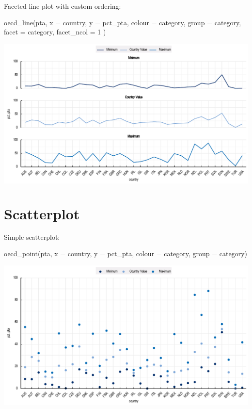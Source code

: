 \documentclass[
  11pt,
  oneside]{report}
\newenvironment{Shaded}{\begin{snugshade}}{\end{snugshade}}
\newcommand{\AttributeTok}[1]{\textcolor[rgb]{0.77,0.63,0.00}{#1}}
\newcommand{\DecValTok}[1]{\textcolor[rgb]{0.00,0.00,0.81}{#1}}
\newcommand{\FunctionTok}[1]{\textcolor[rgb]{0.00,0.00,0.00}{#1}}
\newcommand{\NormalTok}[1]{#1}
\begin{document}
Faceted line plot with custom ordering:

\begin{Shaded}
\begin{Highlighting}[]
\FunctionTok{oecd\_line}\NormalTok{(pta,}
  \AttributeTok{x =}\NormalTok{ country, }\AttributeTok{y =}\NormalTok{ pct\_pta, }\AttributeTok{colour =}\NormalTok{ category, }\AttributeTok{group =}\NormalTok{ category,}
  \AttributeTok{facet =}\NormalTok{ category, }\AttributeTok{facet\_ncol =} \DecValTok{1}
\NormalTok{)}
\end{Highlighting}
\end{Shaded}

\begin{center}\includegraphics{book_figures/sl3-1} \end{center}

\hypertarget{scatterplot}{%
\section{Scatterplot}\label{scatterplot}}

Simple scatterplot:

\begin{Shaded}
\begin{Highlighting}[]
\FunctionTok{oecd\_point}\NormalTok{(pta, }\AttributeTok{x =}\NormalTok{ country, }\AttributeTok{y =}\NormalTok{ pct\_pta, }\AttributeTok{colour =}\NormalTok{ category, }\AttributeTok{group =}\NormalTok{ category)}
\end{Highlighting}
\end{Shaded}

\begin{center}\includegraphics{book_figures/sp1-1} \end{center}
\end{document}
